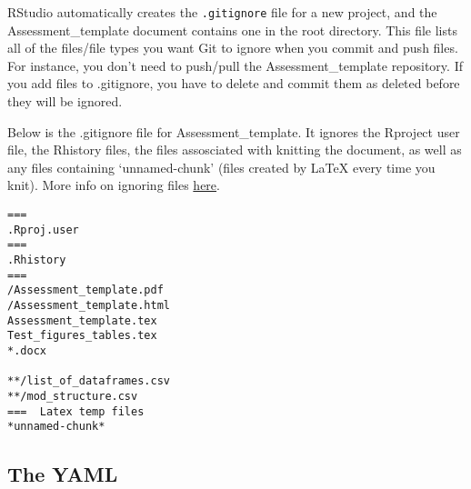 \documentclass[12pt,]{article}
\begin{document}
RStudio automatically creates the \texttt{.gitignore} file for a new
project, and the Assessment\_template document contains one in the root
directory. This file lists all of the files/file types you want Git to
ignore when you commit and push files. For instance, you don't need to
push/pull the Assessment\_template repository. If you add files to
.gitignore, you have to delete and commit them as deleted before they
will be ignored.

Below is the .gitignore file for Assessment\_template. It ignores the
Rproject user file, the Rhistory files, the files assosciated with
knitting the document, as well as any files containing `unnamed-chunk'
(files created by LaTeX every time you knit). More info on ignoring
files \href{http://git-scm.com/docs/gitignore}{here}.

\begin{Verbatim}[frame=single]
===  
.Rproj.user 
===   
.Rhistory  
===   
/Assessment_template.pdf
/Assessment_template.html
Assessment_template.tex
Test_figures_tables.tex
*.docx

**/list_of_dataframes.csv
**/mod_structure.csv
===  Latex temp files  
*unnamed-chunk*
\end{Verbatim}

\subsection{The YAML}\label{the-yaml}
\end{document}
